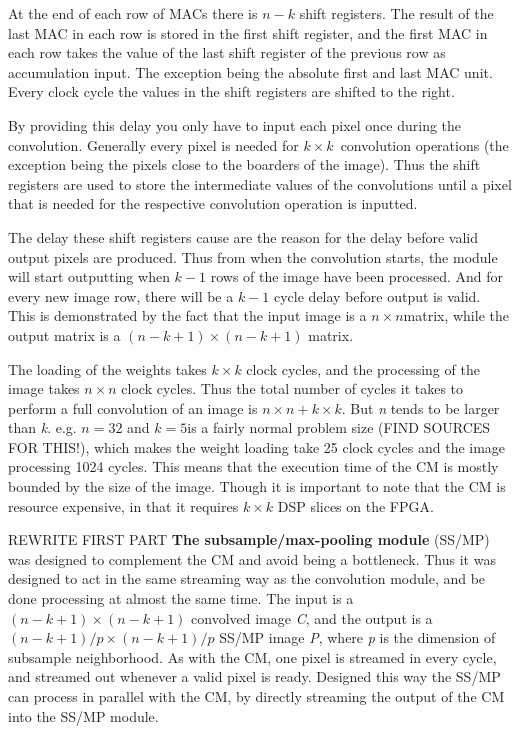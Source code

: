 At the end of each row of MACs there is $ n - k $ shift registers. The result of the last MAC in each row is stored in the first shift register, and the first MAC in each row takes the value of the last shift register of the previous row as accumulation input. The exception being the absolute first and last MAC unit. Every clock cycle the values in the shift registers are shifted to the right. 
	
By providing this delay you only have to input each pixel once during the convolution. Generally every pixel is needed for $ k \times k $ convolution operations (the exception being the pixels close to the boarders of the image). Thus the shift registers are used to store the intermediate values of the convolutions until a pixel that is needed for the respective convolution operation is inputted. 

The delay these shift registers cause are the reason for the delay before valid output pixels are produced. Thus from when the convolution starts, the module will start outputting when $ k-1 $ rows of the image have been processed. And for every new image row, there will be a $ k-1 $ cycle delay before output is valid. This is demonstrated by the fact that the input image is a $ n \times n $matrix, while the output matrix is a $ (n-k+1) \times (n-k+1) $ matrix. 

The loading of the weights takes $ k \times k $ clock cycles, and the processing of the image takes $ n \times n $ clock cycles. Thus the total number of cycles it takes to perform a full convolution of an image is $ n \times n + k \times k $. But \textit{n} tends to be larger than \textit{k}. e.g. $ n = 32 $ and $ k = 5 $is a fairly normal problem size (FIND SOURCES FOR THIS!), which makes the weight loading take 25 clock cycles and the image processing 1024 cycles. This means that the execution time of the CM is mostly bounded by the size of the image. Though it is important to note that the CM is resource expensive, in that it requires $ k \times k $ DSP slices on the FPGA.

\vspace*{1\baselineskip}
REWRITE FIRST PART
\textbf{The subsample/max-pooling module} (SS/MP) was designed to complement the CM and avoid being a bottleneck. Thus it was designed to act in the same streaming way as the convolution module, and be done processing at almost the same time. The input is a $ (n-k+1) \times (n-k+1) $ convolved image \textit{C}, and the output is a $ (n-k+1)/p \times (n-k+1)/p $ SS/MP image \textit{P}, where \textit{p} is the dimension of subsample neighborhood. As with the CM, one pixel is streamed in every cycle, and streamed out whenever a valid pixel is ready. Designed this way the SS/MP can process in parallel with the CM, by directly streaming the output of the CM into the SS/MP module. 

